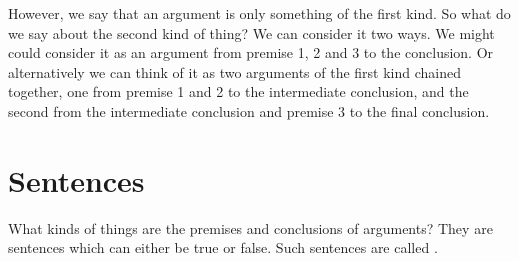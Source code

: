 However, we say that an argument is only something of the first kind. So what do we say about the second kind of thing? We can consider it two ways. We might could consider it as an argument from premise 1, 2 and 3 to the conclusion. Or alternatively we can think of it as two arguments of the first kind chained together, one from premise 1 and 2 to the intermediate conclusion, and the second from the intermediate conclusion and premise 3 to the final conclusion.


%
%


\section{Sentences}
\label{intro.sentences}
What kinds of things are the premises and conclusions of arguments? They are sentences which can either be true or false.
Such sentences are called .

